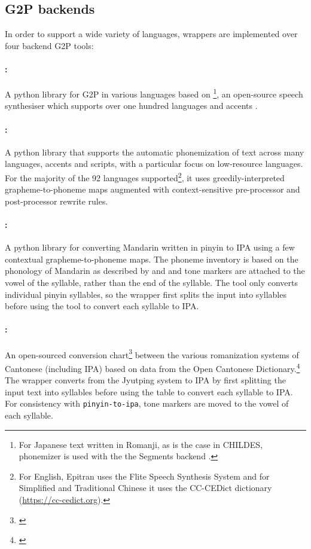 \subsection{G2P backends}\label{sec:13-backends}

In order to support a wide variety of languages, wrappers are implemented over four backend G2P tools:

\paragraph{ \citep{Bernard2021}:} A python library for G2P in various languages based on \footnote{For Japanese text written in Romanji, as is the case in CHILDES, phonemizer is used with the the Segments backend \citep{robert_forkel_2019_3549784}.}, an open-source speech synthesiser which supports over one hundred languages and accents \citep{Dunn2019}.

\paragraph{ \citep{Mortensen-et-al:2018}:} A python library that supports the automatic phonemization of text across many languages, accents and scripts, with a particular focus on low-resource languages. For the majority of the 92 languages supported\footnote{For English, Epitran uses the Flite Speech Synthesis System \citep{black2001flite} and for Simplified and Traditional Chinese it uses the CC-CEDict dictionary (\url{https://cc-cedict.org}).}, it uses greedily-interpreted grapheme-to-phoneme maps augmented with context-sensitive pre-processor and post-processor rewrite rules.

\paragraph{ \citep{taubert_2024_pinyin-to-ipa_2024}:} A python library for converting Mandarin written in pinyin to IPA using a few contextual grapheme-to-phoneme maps. The phoneme inventory is based on the phonology of Mandarin as described by \cite{lin2007sounds} and \cite{duanmu2007phonology} and tone markers are attached to the vowel of the syllable, rather than the end of the syllable. The tool only converts individual pinyin syllables, so the wrapper first splits the input into syllables before using the tool to convert each syllable to IPA.

\paragraph{:} An open-sourced conversion chart\footnote{\href{https://github.com/kfcd/pingyam}{}} between the various romanization systems of Cantonese (including IPA) based on data from the Open Cantonese Dictionary.\footnote{\href{https://www.kaifangcidian.com/han/yue/}{}} The wrapper converts from the Jyutping system to IPA by first splitting the input text into syllables before using the table to convert each syllable to IPA. For consistency with \texttt{pinyin-to-ipa}, tone markers are moved to the vowel of each syllable. 

